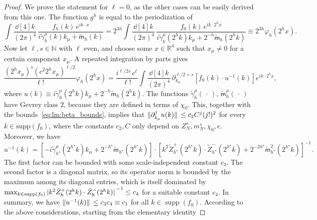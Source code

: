 \documentclass[a4paper, 11pt]{article}
\newcommand{\R}{\mathbb{R}}
\newcommand{\N}{\mathbb{N}}
\newcommand{\sing}[2]{{#1}^{#2}}							%
\renewcommand{\phi}{\varphi}								%
\DeclareMathOperator{\supp}{supp}							%
\theoremstyle{thm}
\begin{document}
\begin{proof}
We prove the statement for $\ell = 0$, as the other cases can be easily derived from this one. The function $\sing{g}{h}$ is equal to the periodization of
\begin{equation}
\label{eq:propagator_periodization}
\int \frac{\dd[4]{k}}{(2\pi)^4} \, \frac{f_h(k) \, e^{i k \cdot x}}{i \tilde{\gamma}^\mu_h(k) k_\mu + \tilde{\mathsf{m}}_h(k)} = 2^{3h} \int \frac{\dd[4]{k}}{(2\pi)^4} \, \frac{f_0(k) \, e^{i k \cdot 2^h x}}{i \tilde{\gamma}^\mu_h(2^h k) k_\mu + 2^{-h}\tilde{\mathsf{m}}_h(2^h k)} \equiv 2^{3h} \phi_h(2^h x).
\end{equation}
Now let $\ell, s \in \N$ with $\ell$ even, and choose some $x \in \R^4$ such that $x_\mu \ne 0$ for a certain component $x_\mu$. A repeated integration by parts gives
\begin{equation}
\label{eq:lm:integration_by_parts}
\frac{(2^h x_\mu)^s (c^2 2^h x_\mu)^{\ell/2}}{\ell!} \phi_h(2^h x) = \frac{i^{\ell/2s} \, c^\ell}{\ell!} \int \frac{\dd[4]{k}}{(2\pi)^4} \, \partial_{k_\mu}^{\ell/2 + s}[ f_0(k) \cdot u^{-1}(k) ] e^{i k \cdot 2^h x},
\end{equation}
where $u(k) \equiv i \tilde{\gamma}^\mu_h(2^h k) k_\mu + 2^{-h}\tilde{\mathsf{m}}_h(2^h k)$. The functions $\tilde{\gamma}^\mu_h(\, \cdot \,)$, $\tilde{\mathsf{m}}^\mu_h(\, \cdot \,)$ have Gevrey class $2$, because they are defined in terms of $\chi_0$. This, together with the bounds~\eqref{eq:lm:beta_bounds}, implies that $\norm*{\partial^j_{k_\mu} u(k)} \le c_2 C^j (j!)^2$ for every $k \in \mathrm{supp}(f_0)$, where the constants $c_2, C$ only depend on $Z^s_N, m^s_N, \chi_0, \epsilon$. Moreover, we have
\begin{equation}
\label{eq:lm:u-1}
u^{-1}(k) = [-i \tilde{\gamma}^\mu_{h^\star}(2^{h^\star} k) k_\mu + 2^{-h^\star}\tilde{\mathsf{m}}_{h^\star}(2^{h^\star} k)] \cdot [k^2 \tilde{Z}^+_{h^\star}(2^{h^\star} k) \cdot \tilde{Z}^-_{h^\star}(2^{h^\star}k) + 2^{-2h^\star}\tilde{\mathsf{m}}^2_{h^\star}(2^{h^\star} k)]^{-1}.
\end{equation} 
The first factor can be bounded with some scale-independent constant $c_3$. The second factor is a diagonal matrix, so its operator norm is bounded by the maximum among its diagonal entries, which is itself dominated by $\max_{k \in \supp(f_0)} \abs*{k^2 \tilde{Z}^+_h(2^h k) \cdot \tilde{Z}^-_h(2^h k)}^{-1} \le c_4$ for a suitable constant $c_4$. In summary, we have $\norm*{u^{-1}(k)} \le c_3c_4 \equiv c_1$ for all $k \in \supp(f_0)$. According to the above considerations, starting from the elementary identity

\end{proof}
\end{document}
